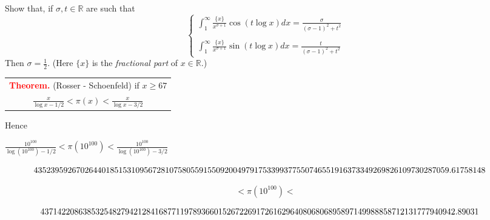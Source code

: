 \documentclass[landscape,display]{powersem} %
\newcommand{\heading}[1]{%
 \begin{center}
  \large\bf
  \shadowbox{{\textcolor{conceptcolor}{#1}}}%
 \end{center}
 \vspace{1ex minus 1ex}}
\begin{document}
\begin{slide}
\heading{The beautiful formula of Riemann}\pause

\ \ \ \ \ \ \ \ \ \ \pause\vspace*{-0.2cm}
\heading{Exercise}
Show that, if $\sigma,t\in\mathbb R$ are such that
$$\begin{cases}\displaystyle{\int_1^\infty \frac{\{x\}}{x^{\sigma+1}}\cos(t\log x)dx=\frac{\sigma}{(\sigma-1)^2+t^2}}\\\\\displaystyle{\int_1^\infty \frac{\{x\}}{x^{\sigma+1}}\sin(t\log x)dx=\frac{t}{(\sigma-1)^2+t^2}}\end{cases}$$
Then $\sigma=\frac12$.\hfill\qquad\qquad\tiny{ (Here $\{x\}$ is the \emph{fractional part} of $x\in\mathbb R$.)}\end{slide}

\begin{slide}
\heading{Explicit distribution of prime numbers}\pause



\begin{center}
\begin{tabular}{|c|}\hline
\textbf{\textcolor{red}{Theorem.}} (Rosser - Schoenfeld) if $x\geq 67$\\
 $\displaystyle{\frac{x}{\log x-1/2}< \pi(x)< \frac{x}{\log x-3/2}}$\\
\hline\end{tabular}
\end{center}\pause

Hence

 $\frac{10^{100}}{\log(10^{100})-1/2}<\pi(10^{100})< \frac{10^{100}}{\log(10^{100})-3/2}$\pause

\begin{tiny}
$$\hspace*{-0.5cm}43523959267026440185153109567281075805591550920049791753399377550746551916373349269826109730287059.61758148$$
\end{tiny}\vspace*{-5mm}
$$< \pi(10^{100})< $$
\begin{tiny}
$$\hspace*{-0.5cm}43714220863853254827942128416877119789366015267226917261629640806806895897149988858712131777940942.89031$$
\end{tiny}

\end{slide}
\end{document}
